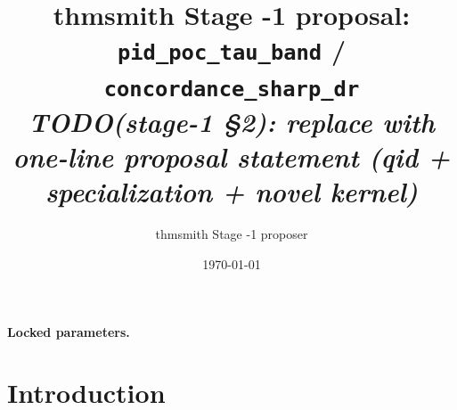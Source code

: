 \documentclass[11pt]{article}
\title{thmsmith Stage -1 proposal: \texttt{pid\_poc\_tau\_band} / \texttt{concordance\_sharp\_dr}%
  \\ \large\textit{TODO(stage-1 \S2): replace with one-line proposal statement (qid + specialization + novel kernel)}}
\author{thmsmith Stage -1 proposer}
\date{\today}
\theoremstyle{definition}
\theoremstyle{plain}
\theoremstyle{remark}
\begin{document}
\maketitle


\paragraph{Locked parameters.}

\begin{abstract}
\end{abstract}

\section{Introduction}
%
%
%
%
\end{document}

